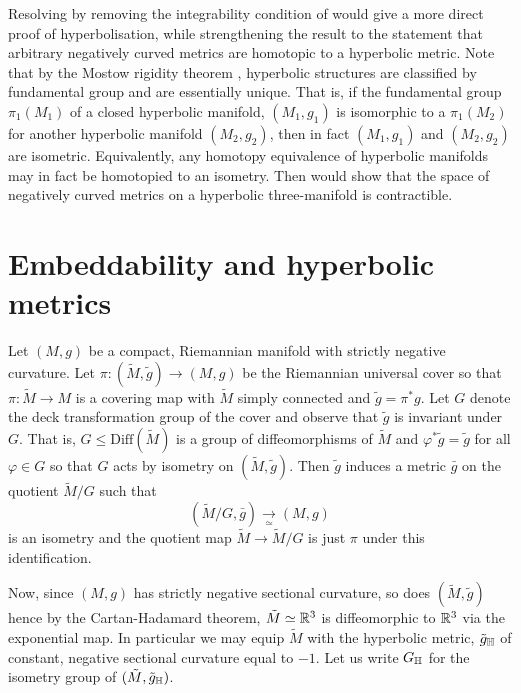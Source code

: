 \documentclass[a4paper,12pt]{amsart}
\begin{document}
Resolving  by removing the integrability condition of  would give a more direct proof of hyperbolisation, while strengthening the result to the statement that arbitrary negatively curved metrics are homotopic to a hyperbolic metric. Note that by the Mostow rigidity theorem \cite{MR0236383}, hyperbolic structures are classified by fundamental group and are essentially unique. That is, if the fundamental group \(\pi_1(M_1)\) of a closed hyperbolic manifold, \((M_1, g_1)\) is isomorphic to a \(\pi_1(M_2)\) for another hyperbolic manifold \((M_2, g_2)\), then in fact \((M_1, g_1)\) and \((M_2, g_2)\) are isometric. Equivalently, any homotopy equivalence of hyperbolic manifolds may in fact be homotopied to an isometry. Then  would show that the space of negatively curved metrics on a hyperbolic three-manifold is contractible.

\section{Embeddability and hyperbolic metrics}
\label{sec:embed_intg}

Let \((M, g)\) be a compact, Riemannian manifold with strictly negative curvature. Let \(\pi\colon (\tilde{M}, \tilde{g}) \to (M, g)\) be the Riemannian universal cover so that \(\pi : \tilde{M} \to M\) is a covering map with \(\tilde{M}\) simply connected and \(\tilde{g} = \pi^{\ast} g\). Let \(G\) denote the deck transformation group of the cover and observe that \(\tilde{g}\) is invariant under \(G\). That is, \(G \leq \text{Diff}(\tilde{M})\) is a group of diffeomorphisms of \(\tilde{M}\) and \(\varphi^{\ast} \tilde{g} = \tilde{g}\) for all \(\varphi \in G\) so that \(G\) acts by isometry on \((\tilde{M}, \tilde{g})\). Then \(\tilde{g}\) induces a metric \(\bar{g}\) on the quotient \(\tilde{M}/G\) such that
\[
(\tilde{M}/G, \bar{g}) \underset{\simeq}{\to} (M, g)
\]
is an isometry and the quotient map \(\tilde{M} \to \tilde{M}/G\) is just \(\pi\) under this identification. 

Now, since \((M, g)\) has strictly negative sectional curvature, so does \((\tilde{M}, \tilde{g})\) hence by the Cartan-Hadamard theorem, \(\tilde{M} \simeq \mathbb{R}^3\) is diffeomorphic to \(\mathbb{R}^3\) via the exponential map. In particular we may equip \(\tilde{M}\) with the hyperbolic metric, \(\tilde{g}_{\mathbb{H}}\) of constant, negative sectional curvature equal to \(-1\). Let us write \(G_{\mathbb{H}}\) for the isometry group of \((\tilde{M}, \tilde{g}_{\mathbb{H}})\).
\end{document}

